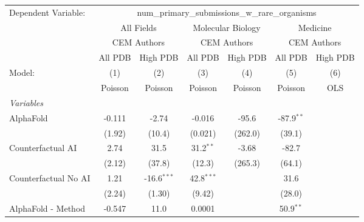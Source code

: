 \begingroup
\centering
\begin{tabular}{lcccccc}
   \tabularnewline \midrule \midrule
   Dependent Variable: & \multicolumn{6}{c}{num\_primary\_submissions\_w\_rare\_organisms}\\
 & \multicolumn{2}{c}{All Fields} & \multicolumn{2}{c}{Molecular Biology} & \multicolumn{2}{c}{Medicine} \\
\cmidrule(lr){2-3} \cmidrule(lr){4-5} \cmidrule(lr){6-7}
 & \multicolumn{2}{c}{CEM Authors} & \multicolumn{2}{c}{CEM Authors} & \multicolumn{2}{c}{CEM Authors} \\
\cmidrule(lr){2-3} \cmidrule(lr){4-5} \cmidrule(lr){6-7}
 & \multicolumn{1}{c}{All PDB} & \multicolumn{1}{c}{High PDB} & \multicolumn{1}{c}{All PDB} & \multicolumn{1}{c}{High PDB} & \multicolumn{1}{c}{All PDB} & \multicolumn{1}{c}{High PDB} \\
\cmidrule(lr){2-2} \cmidrule(lr){3-3} \cmidrule(lr){4-4} \cmidrule(lr){5-5} \cmidrule(lr){6-6} \cmidrule(lr){7-7}
   Model:                                                     & (1)      & (2)           & (3)          & (4)     & (5)          & (6)\\  
                                                              &  Poisson & Poisson       & Poisson      & Poisson & Poisson      & OLS\\  
   \midrule
   \emph{Variables}\\
   AlphaFold                                                  & -0.111   & -2.74         & -0.016       & -95.6   & -87.9$^{**}$ &   \\   
                                                              & (1.92)   & (10.4)        & (0.021)      & (262.0) & (39.1)       &   \\   
   Counterfactual AI                                          & 2.74     & 31.5          & 31.2$^{**}$  & -3.68   & -82.7        &   \\   
                                                              & (2.12)   & (37.8)        & (12.3)       & (265.3) & (64.1)       &   \\   
   Counterfactual No AI                                       & 1.21     & -16.6$^{***}$ & 42.8$^{***}$ &         & 31.6         &   \\   
                                                              & (2.24)   & (1.30)        & (9.42)       &         & (28.0)       &   \\   
   AlphaFold - Method                                         & -0.547   & 11.0          & 0.0001       &         & 50.9$^{**}$  &   \\   

\end{tabular}
